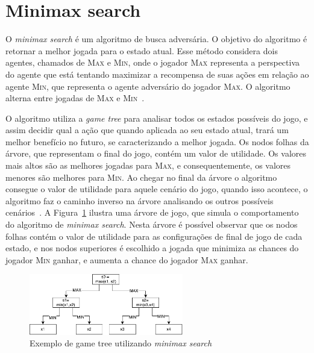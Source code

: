 \section{Minimax search}

O \textit{minimax search} é um algoritmo de busca adversária. 
O objetivo do algoritmo é retornar a melhor jogada para o estado atual. 
Esse método considera dois agentes, chamados de \textsc{Max} e \textsc{Min}, onde o jogador \textsc{Max} representa a perspectiva do agente que está tentando maximizar a recompensa de suas ações em relação ao agente \textsc{Min}, que representa o agente adversário do jogador \textsc{Max}. 
O algoritmo alterna entre jogadas de \textsc{Max} e \textsc{Min}~\cite[Capítulo 5]{intelligence2003modern}. 

O algoritmo utiliza a \textit{game tree} para analisar todos os estados possíveis do jogo, e assim decidir qual a ação que quando aplicada ao seu estado atual, trará um melhor benefício no futuro, se caracterizando a melhor jogada. 
Os nodos folhas da árvore, que representam o final do jogo, contém um valor de utilidade. 
Os valores mais altos são as melhores jogadas para \textsc{Max}, e consequentemente, os valores menores são melhores para \textsc{Min}. 
Ao chegar no final da árvore o algoritmo consegue o valor de utilidade para aquele cenário do jogo, quando isso acontece, o algoritmo faz o caminho inverso na árvore analisando os outros possíveis cenários~\cite[Capítulo 5]{intelligence2003modern}. 
A Figura~\ref{fig:gametree} ilustra uma árvore de jogo, que simula o comportamento do algoritmo de \textit{minimax search}. Nesta árvore é possível observar que os nodos folhas contém o valor de utilidade para as configurações de final de jogo de cada estado, e nos nodos superiores é escolhido a jogada que minimiza as chances do jogador \textsc{Min} ganhar, e aumenta a chance do jogador \textsc{Max} ganhar.

\begin{figure}[ht]
	\centering
	\includegraphics[width=0.6\textwidth]{fig/gametree.pdf}
	\caption{Exemplo de game tree utilizando \textit{minimax search}}
	\label{fig:gametree}
\end{figure} 

